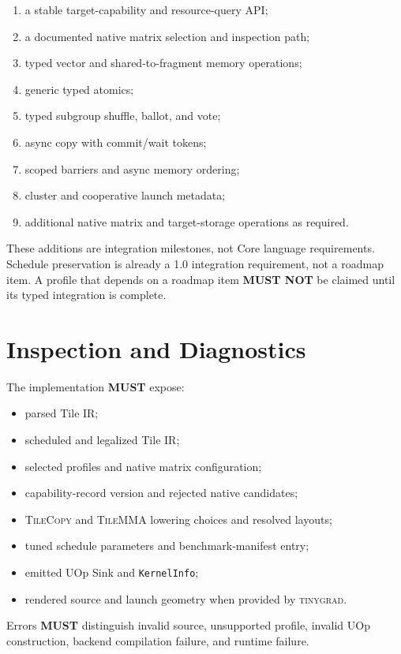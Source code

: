 \documentclass[10pt,letterpaper]{article}
\newcommand{\tinygrad}{\textsc{tinygrad}}
\newcommand{\op}[1]{\textsc{#1}}
\newcommand{\must}{\textbf{MUST}}
\newcommand{\mustnot}{\textbf{MUST NOT}}
\begin{document}
\begin{enumerate}[leftmargin=1.5em,itemsep=1pt,topsep=2pt]
  \item a stable target-capability and resource-query API;
  \item a documented native matrix selection and inspection path;
  \item typed vector and shared-to-fragment memory operations;
  \item generic typed atomics;
  \item typed subgroup shuffle, ballot, and vote;
  \item async copy with commit/wait tokens;
  \item scoped barriers and async memory ordering;
  \item cluster and cooperative launch metadata;
  \item additional native matrix and target-storage operations as required.
\end{enumerate}

These additions are integration milestones, not Core language requirements.
Schedule preservation is already a 1.0 integration requirement, not a roadmap
item. A profile that depends on a roadmap item \mustnot{} be claimed until its
typed integration is complete.

\section*{Inspection and Diagnostics}

The implementation \must{} expose:

\begin{itemize}
  \item parsed Tile IR;
  \item scheduled and legalized Tile IR;
  \item selected profiles and native matrix configuration;
  \item capability-record version and rejected native candidates;
  \item \op{TileCopy} and \op{TileMMA} lowering choices and resolved layouts;
  \item tuned schedule parameters and benchmark-manifest entry;
  \item emitted UOp Sink and \texttt{KernelInfo};
  \item rendered source and launch geometry when provided by \tinygrad{}.
\end{itemize}

Errors \must{} distinguish invalid source, unsupported profile, invalid UOp
construction, backend compilation failure, and runtime failure.
\end{document}
